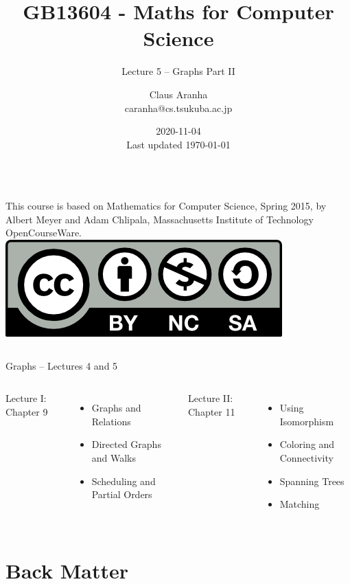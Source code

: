 \documentclass[aspectratio=169]{beamer}
\title[GB13604]{GB13604 - Maths for Computer Science}
\subtitle[]{Lecture 5 -- Graphs Part II}
\author[Claus Aranha]{Claus Aranha\\{\footnotesize caranha@cs.tsukuba.ac.jp}}
\institute[COINS]{College of Information Science}
\date[2020-11-04]{2020-11-04\\{\tiny Last updated \today}}
\begin{document}
\begin{frame}
  \maketitle

  \begin{columns}
    {\smaller This course is based on Mathematics for Computer Science, Spring
    2015, by Albert Meyer and Adam Chlipala, Massachusetts Institute
    of Technology OpenCourseWare.}
    \includegraphics[width=\textwidth]{../img/by-nc-sa}
  \end{columns}
\end{frame}

\begin{frame}{Graphs -- Lectures 4 and 5}
  \begin{columns}
    \begin{center}
      Lecture I: Chapter 9
    \end{center}
    \begin{itemize}
      \item Graphs and Relations
      \item Directed Graphs and Walks
      \item Scheduling and Partial Orders
    \end{itemize}

    \begin{center}
      Lecture II: Chapter 11
    \end{center}
    \begin{itemize}
    \item Using Isomorphism
    \item Coloring and Connectivity
    \item Spanning Trees
    \item Matching
    \end{itemize}
  \end{columns}
\end{frame}











\section{Back Matter}

\end{document}
